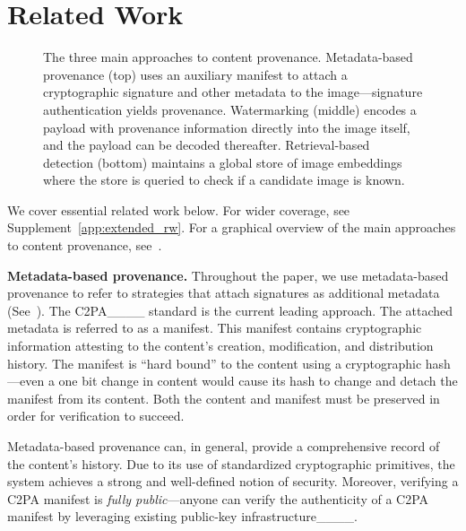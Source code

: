 \section{Related Work}
\begin{figure*}[t]
    \centering
    \caption{The three main approaches to content provenance. 
    Metadata-based provenance (top) uses an auxiliary manifest to attach a cryptographic signature and other metadata to the image---signature authentication yields provenance.
    Watermarking (middle) encodes a payload with provenance information directly into the image itself, and the payload can be decoded thereafter.
    Retrieval-based detection (bottom) maintains a global store of image embeddings where the store is queried to check if a candidate image is known.}
    \label{fig:misinformation_approaches}
\end{figure*}
We cover essential related work below.
For wider coverage, see Supplement~\ref{app:extended_rw}.
For a graphical overview of the main approaches to content provenance, see~.

\textbf{Metadata-based provenance.}
Throughout the paper, we use metadata-based provenance to refer to strategies that attach signatures as additional metadata (See~).
The C2PA____ standard is the current leading approach.
The attached metadata is referred to as a manifest.
This manifest contains cryptographic information attesting to the content's creation, modification, and distribution history.
The manifest is ``hard bound'' to the content using a cryptographic hash---even a one bit change in content would cause its hash to change and detach the manifest from its content.
Both the content and manifest must be preserved in order for verification to succeed.

Metadata-based provenance can, in general, provide a comprehensive record of the content's history.
Due to its use of standardized cryptographic primitives, the system achieves a strong and well-defined notion of security.
Moreover, verifying a C2PA manifest is \textit{fully public}---anyone can verify the authenticity of a C2PA manifest by leveraging existing public-key infrastructure____.

